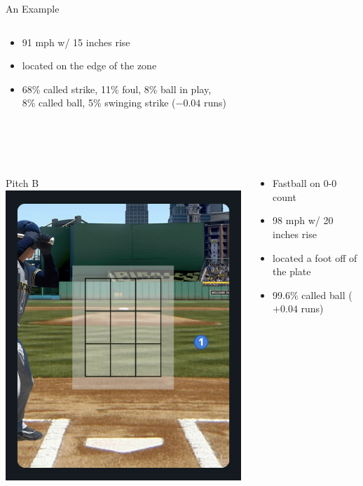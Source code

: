 \documentclass{beamer}
\begin{document}
\begin{frame}{An Example}
\begin{columns}
\begin{column}{0.8\textwidth}
\begin{itemize}
          \item 91 mph w/ 15 inches rise
          \item located on the edge of the zone
          \item 68\% called strike, 11\% foul, 8\% ball in play,\\
            8\% called ball, 5\% swinging strike ($-0.04$ runs)
        \end{itemize}
      \end{column}
    \end{columns}
    ~\\
    ~\\
    \begin{columns}
      \begin{column}{0.2\textwidth}
        \centering
        Pitch B\\
        \includegraphics[width = \textwidth]{images/pitch_outside}
      \end{column}
      \begin{column}{0.8\textwidth}
        \begin{itemize}
          \item Fastball on 0-0 count
          \item 98 mph w/ 20 inches rise
          \item located a foot off of the plate
          \item 99.6\% called ball ($+0.04$ runs)
        \end{itemize}
      \end{column}
    \end{columns}
  \end{frame}
\end{document}
